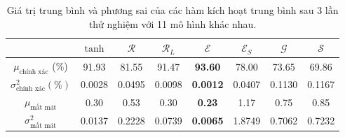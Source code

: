 \begin{table}[ht!]
\centering
\def\arraystretch{1.5}
\begin{tabular}{c|c|c|c|c|c|c|c|}
\cline{2-8}
                        & $\tanh$      & $\mathcal{R}$      & $\mathcal{R}_L$      & $\mathcal{E}$      & $\mathcal{E}_S$      & $\mathcal{G}$      & $\mathcal{S}$      \\ \hline
\multicolumn{1}{|c|}{$\mu_{\text{chính xác}}$ (\%)} & 91.93  & 81.55  & 91.47  & \textbf{93.60}   & 78.00  & 73.65  & 69.86  \\ \hline
\multicolumn{1}{|c|}{$\sigma^2_{\text{chính xác}} (\%)$} & 0.0028 & 0.0495 & 0.0098 & \textbf{0.0012} & 0.0407 & 0.1130 & 0.1167 \\ \hline
\multicolumn{1}{|c|}{$\mu_{\text{mất mát}}$} & 0.30   & 0.53   & 0.30   & \textbf{0.23}   & 1.17   & 0.75   & 0.85   \\ \hline
\multicolumn{1}{|c|}{$\sigma^2_{\text{mất mát}}$} & 0.0137 & 0.2228 & 0.0739 & \textbf{0.0065} & 1.8749 & 0.7062 & 0.7232 \\ \hline
\end{tabular}
\caption{Giá trị trung bình và phương sai của các hàm kích hoạt trung bình sau 3 lần thử nghiệm với 11 mô hình khác nhau.}
\end{table}

